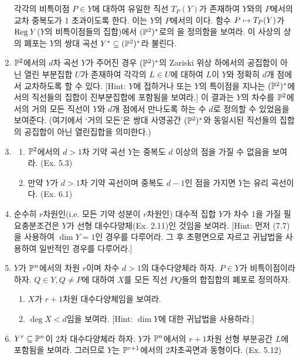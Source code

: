 \begin{enumerate}[label=\tb{7.\arabic*.},itemindent=0mm,itemsep=2mm]
	각각의 비특이점 $P\in Y$에 대하여 유일한 직선 $T_P(Y)$가 존재하여 $Y$와의 $P$에서의 교차 중복도가 1 초과이도록 한다.
	이는 $Y$의 $P$에서의 이다.
	함수 $P\mapsto T_P(Y)$가 $\mathrm{Reg}\:Y$($Y$의 비특이점들의 집합)에서 $(\mathbb{P}^2)^*$로의 을 정의함을 보여라.
	이 사상의 상의 폐포는 $Y$의 쌍대 곡선 $Y^*\subseteq(\mathbb{P}^2)^*$라 불린다.
	\item $\mathbb{P}^2$에서의 $d$차 곡선 $Y$가 주어진 경우 $(\mathbb{P}^2)^*$의 Zariski 위상 하에서의 공집합이 아닌 열린 부분집합
	$U$가 존재하여 각각의 $L\in U$에 대하여 $L$이 $Y$와 정확히 $d$개 점에서 교차하도록 할 수 있다.
	[Hint: $Y$에 접하거나 또는 $Y$의 특이점을 지나는 $(\mathbb{P}^2)^*$에서의 직선들의 집합이 진부분집합에 포함됨을 보여라.]
	이 결과는 $Y$의 차수를 $\mathbb{P}^2$에서의 거의 모든 직선이 $Y$와 $d$개 점에서 만나도록 하는 수 $d$로 정의할 수 있었음을 보여준다.
	(여기에서 `거의 모든'은 쌍대 사영공간 $(\mathbb{P}^2)^*$와 동일시된 직선들의 집합의 공집합이 아닌 열린집합을 의미한다.)
	\item \begin{enumerate}[label=(\alph*)]
	\item $\mathbb{P}^2$에서의 $d>1$차 기약 곡선 $Y$는 중복도 $d$ 이상의 점을 가질 수 없음을 보여라. (Ex. 5.3)
	\item 만약 $Y$가 $d>1$차 기약 곡선이며 중복도 $d-1$인 점을 가지면 $Y$는 유리 곡선이다. (Ex. 6.1)
	\end{enumerate}
	\item {} 순수히 $r$차원인(i.e. 모든 기약 성분이 $r$차원인) 대수적 집합 $Y$가 차수 1을 가질 필요충분조건은
	$Y$가 선형 대수다양체(Ex. 2.11)인 것임을 보여라. [Hint: 먼저 (7.7)을 사용하여 $\dim Y=1$인 경우를 다루어라.
	그 후 초평면으로 자르고 귀납법을 사용하여 일반적인 경우를 다루어라.]
	\item $Y$가 $\mathbb{P}^n$에서의 차원 $r$이며 차수 $d>1$의 대수다양체라 하자. $P\in Y$가 비특이점이라 하자.
	$Q\in Y,Q\ne P$에 대하여 $X$를 모든 직선 $PQ$들의 합집합의 폐포로 정의하자.
	\begin{enumerate}[label=(\alph*)]
	\item $X$가 $r+1$차원 대수다양체임을 보여라.
	\item $\deg X<d$임을 보여라. [Hint: $\dim Y$에 대한 귀납법을 사용하라.]
	\end{enumerate}
	\item $Y^r\subseteq\mathbb{P}^n$이 2차 대수다양체라 하자. $Y$가 $\mathbb{P}^n$에서의 $r+1$차원 선형 부분공간 $L$에 포함됨을 보여라.
	그러므로 $Y$는 $\mathbb{P}^{r+1}$에서의 2차초곡면과 동형이다. (Ex. 5.12)
	\end{enumerate}
	
